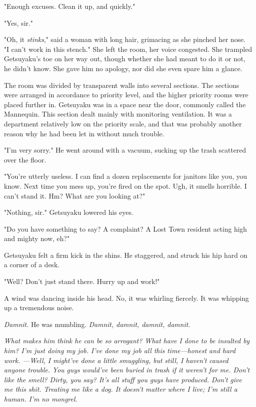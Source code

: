 "Enough excuses. Clean it up, and quickly."

"Yes, sir."

"Oh, it \emph{stinks}," said a woman with long hair, grimacing as she pinched
her nose. "I can't work in this stench." She left the room, her voice
congested. She trampled Getsuyaku's toe on her way out, though whether
she had meant to do it or not, he didn't know. She gave him no apology,
nor did she even spare him a glance.

The room was divided by transparent walls into several sections. The
sections were arranged in accordance to priority level, and the higher
priority rooms were placed further in. Getsuyaku was in a space near the
door, commonly called the Mannequin. This section dealt mainly with
monitoring ventilation. It was a department relatively low on the
priority scale, and that was probably another reason why he had been let
in without much trouble.

"I'm very sorry." He went around with a vacuum, sucking up the trash
scattered over the floor.

"You're utterly useless. I can find a dozen replacements for janitors
like you, you know. Next time you mess up, you're fired on the spot.
Ugh, it smells horrible. I can't stand it. Hm? What are you looking at?"

"Nothing, sir." Getsuyaku lowered his eyes.

"Do you have something to say? A complaint? A Lost Town resident acting
high and mighty now, eh?"

Getsuyaku felt a firm kick in the shins. He staggered, and struck his
hip hard on a corner of a desk.

"Well? Don't just stand there. Hurry up and work!"

A wind was dancing inside his head. No, it was whirling fiercely. It was
whipping up a tremendous noise.

\emph{Damnit.} He was mumbling. \emph{Damnit, damnit, damnit, damnit.}

\emph{What makes him think he can be so arrogant? What have I done to be
insulted by him? I'm just doing my job. I've done my job all this
time---honest and hard work. ---Well, I might've done a little smuggling,
but still, I haven't caused anyone trouble. You guys would've been
buried in trash if it weren't for me. Don't like the smell? Dirty, you
say? It's all stuff you guys have produced. Don't give me this shit.
Treating me like a dog. It doesn't matter where I live; I'm still a
human. I'm no mongrel.}

